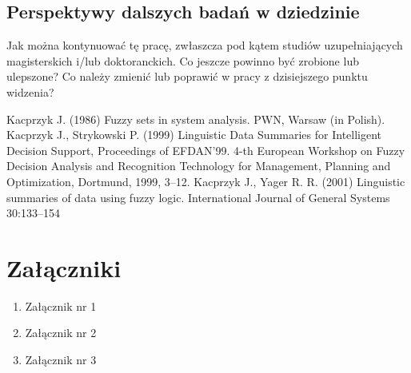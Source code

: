 \documentclass[12pt]{report}
\begin{document}
\section{Perspektywy dalszych badań w dziedzinie}
Jak można kontynuować tę pracę, zwłaszcza pod kątem studiów
uzupełniających magisterskich i/lub doktoranckich. Co jeszcze powinno być
zrobione lub ulepszone? Co należy zmienić lub poprawić w pracy z dzisiejszego punktu widzenia?


\begin{thebibliography}{99}
Kacprzyk J. (1986) Fuzzy sets in system analysis.  PWN, Warsaw (in Polish).
Kacprzyk J., Strykowski P. (1999) Linguistic Data Summaries for Intelligent Decision Support, Proceedings of EFDAN'99. 4-th European Workshop on Fuzzy Decision Analysis and Recognition Technology for Management, Planning and Optimization, Dortmund, 1999, 3--12.
Kacprzyk J., Yager R. R. (2001) Linguistic summaries of data using fuzzy logic. International Journal of General Systems 30:133--154 

\end{thebibliography}

\listoffigures

\listoftables


\chapter*{Załączniki}
\begin{enumerate}
\item Załącznik nr 1
\item Załącznik nr 2
\item Załącznik nr 3
\end{enumerate}
\end{document}
